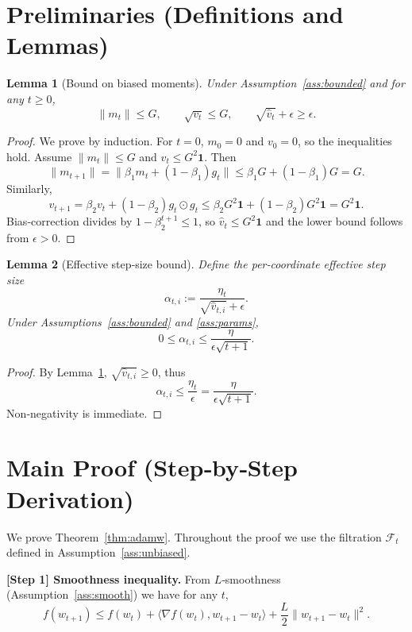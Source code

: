 \documentclass{article}
\newtheorem{lemma}{Lemma}
\begin{document}
\section*{Preliminaries (Definitions and Lemmas)}
\begin{lemma}[Bound on biased moments]\label{lem:momentbounds}
Under Assumption~\ref{ass:bounded} and for any $t\ge0$,
\[
\|m_t\|\le G,\qquad
\sqrt{v_t}\le G,\qquad
\sqrt{\hat v_t}+\epsilon\ge\epsilon.
\]
\end{lemma}
\begin{proof}
We prove by induction.  
For $t=0$, $m_0=0$ and $v_0=0$, so the inequalities hold.  
Assume $\|m_t\|\le G$ and $v_t\le G^2\mathbf{1}$. Then
\[
\|m_{t+1}\| =\|\beta_1 m_t+(1-\beta_1)g_t\|
\le \beta_1 G+(1-\beta_1)G = G.
\]
Similarly,
\[
v_{t+1}= \beta_2 v_t+(1-\beta_2) g_t\odot g_t
\le \beta_2 G^2\mathbf{1}+(1-\beta_2)G^2\mathbf{1}=G^2\mathbf{1}.
\]
Bias‑correction divides by $1-\beta_2^{t+1}\le 1$, so $\hat v_t\le G^2\mathbf{1}$ and the lower bound follows from $\epsilon>0$.
\end{proof}

\begin{lemma}[Effective step‑size bound]\label{lem:stepbound}
Define the per‑coordinate effective step size
\[
\alpha_{t,i}:=\frac{\eta_t}{\sqrt{\hat v_{t,i}}+\epsilon}.
\]
Under Assumptions~\ref{ass:bounded} and \ref{ass:params},
\[
0\le \alpha_{t,i}\le \frac{\eta}{\epsilon\sqrt{t+1}}.
\tag{L1}
\]
\end{lemma}
\begin{proof}
By Lemma~\ref{lem:momentbounds}, $\sqrt{\hat v_{t,i}}\ge0$, thus
\[
\alpha_{t,i}\le \frac{\eta_t}{\epsilon}= \frac{\eta}{\epsilon\sqrt{t+1}}.
\]
Non‑negativity is immediate.
\end{proof}

\section*{Main Proof (Step‑by‑Step Derivation)}
We prove Theorem~\ref{thm:adamw}. Throughout the proof we use the filtration $\mathcal{F}_t$ defined in Assumption~\ref{ass:unbiased}.

\bigskip
\noindent\textbf{[Step 1] Smoothness inequality.}
From $L$‑smoothness (Assumption~\ref{ass:smooth}) we have for any $t$,
\begin{equation}
f(w_{t+1})\le f(w_t)+\langle\nabla f(w_t),w_{t+1}-w_t\rangle
+\frac{L}{2}\|w_{t+1}-w_t\|^2 .
\tag{1}
\end{equation}
\end{document}
